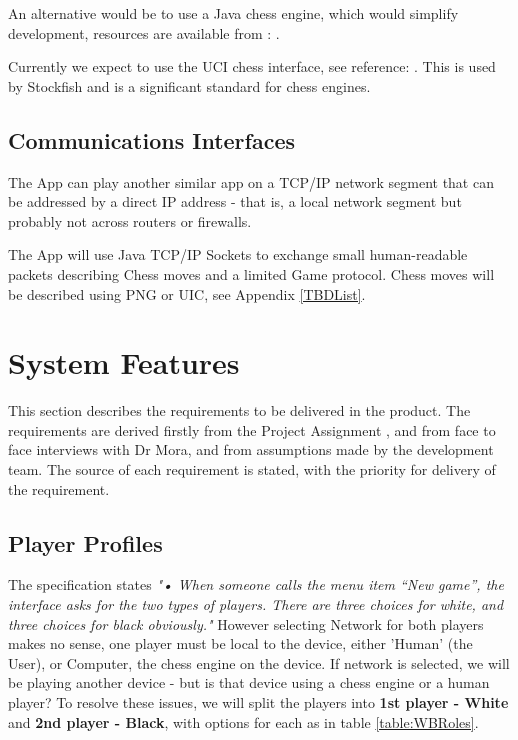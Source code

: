 \documentclass[a4paper,10pt]{article}
\begin{document}
An alternative would be to use a Java chess engine, which would simplify development, resources are available from : \cite{javaChess}.

Currently we expect to use the UCI chess interface, see reference: \cite{UCIInterface}. This is used by Stockfish and is a significant standard for chess engines. 

\subsection{Communications Interfaces}

The App can play another similar app on a TCP/IP network segment that can be addressed by a direct IP address - that is, a local network segment but probably not across routers or firewalls.

The App will use Java TCP/IP Sockets to exchange small human-readable packets describing Chess moves and a limited Game protocol. Chess moves will be described using PNG or UIC, see Appendix \ref{TBDList}. 



\section{System Features}

This section describes the requirements to be delivered in the product. The requirements are derived firstly from the Project Assignment  , and from face to face interviews with Dr Mora, and from assumptions made by the development team. The source of each requirement is stated, with the priority for delivery of the requirement. 


\subsection{Player Profiles}

The specification states \textit{"• When someone calls the menu item “New game”, the interface asks for the two types of players. There are three choices for white, and three choices for black obviously."}
However selecting Network for both players makes no sense, one player must be local to the device, either 'Human' (the User), or Computer, the chess engine on the device.
If network is selected, we will be playing another device - but is that device using a chess engine or a human player? To resolve these issues, we will split the players into \textbf{1st player - White} and \textbf{2nd player - Black}, with options for each as in table \ref{table:WBRoles}. 
\end{document}
